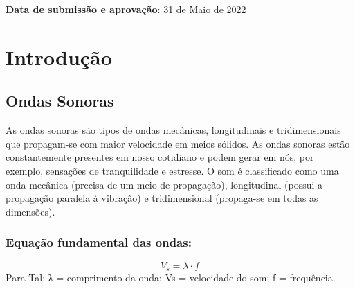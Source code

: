 \documentclass[
	article,			%
	11pt,				%
	oneside,			%
	a4paper,			%
	english,			%
	brazil,				%
	sumario=tradicional
	]{abntex2}
\begin{document}

\begin{center}\smaller
\textbf{Data de submissão e aprovação}: 31 de Maio de 2022
\end{center}

\newpage 
\textual

\section{Introdução}


\subsection{Ondas Sonoras}
As ondas sonoras são tipos de ondas mecânicas, longitudinais e tridimensionais que propagam-se com maior velocidade em meios sólidos.
As ondas sonoras estão constantemente presentes em nosso cotidiano e podem gerar em nós, por exemplo, sensações de tranquilidade e estresse. O som é classificado como uma onda mecânica (precisa de um meio de propagação), longitudinal (possui a propagação paralela à vibração) e tridimensional (propaga-se em todas as dimensões).
    \subsubsection{Equação fundamental das ondas:}
        \begin{equation}
            V_s = \lambda\cdot f
        \end{equation}
        Para Tal:
            λ = comprimento da onda;
            Vs = velocidade do som;
            f = frequência. 
\end{document}
